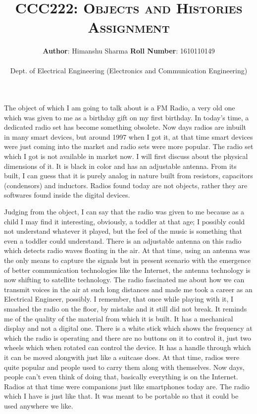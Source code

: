 \documentclass{article}
\title{\textsc{CCC222: Objects and Histories Assignment}}
\author{{\bf Author}: Himanshu Sharma \hspace{50mm} {\bf Roll Number}: 1610110149 \\\\ Dept. of Electrical Engineering (Electronics and Communication Engineering)}
\date{}
\begin{document}
\maketitle
The object of which I am going to talk about is a FM Radio, a very old one which was given to me as a birthday gift on my first birthday. In today's time, a dedicated radio set has become something obsolete. Now days radios are inbuilt in many smart devices, but around 1997 when I got it, at that time smart devices were just coming into the market and radio sets were more popular. The radio set which I got is not available in market now. I will first discuss about the physical dimensions of it. It is black in color and has an adjustable antenna. From its built, I can guess that it is purely analog in nature built from resistors, capacitors (condensors) and inductors. Radios found today are not objects, rather they are softwares found inside the digital devices. 

\par Judging from the object, I can say that the radio was given to me because as a child I may find it interesting, obviously, a toddler at that age; I possibly could not understand whatever it played, but the feel of the music is something that even a toddler could understand. There is an adjustable antenna on this radio which detects radio waves floating in the air. At that time, using an antenna was the only means to capture the signals but in present scenario with the emergence of better communication technologies like the Internet, the antenna technology is now shifting to satellite technology. The radio fascinated me about how we can transmit voices in the air at such long distances and made me took a career as an Electrical Engineer, possibly. I remember, that once while playing with it, I smashed the radio on the floor, by mistake and it still did not break. It reminds me of the quality of the material from which it is built. It has a mechanical display and not a digital one. There is a white stick which shows the frequency at which the radio is operating and there are no buttons on it to control it, just two wheels which when rotated can control the device. It has a handle through which it can be moved alongwith just like a suitcase does. At that time, radios were quite popular and people used to carry them along with themselves. Now days, people can't even think of doing that, basically everything is on the Internet. Radios at that time were companions just like smartphones today are. The radio which I have is just like that. It was meant to be portable so that it could be used anywhere we like. 
\end{document}
